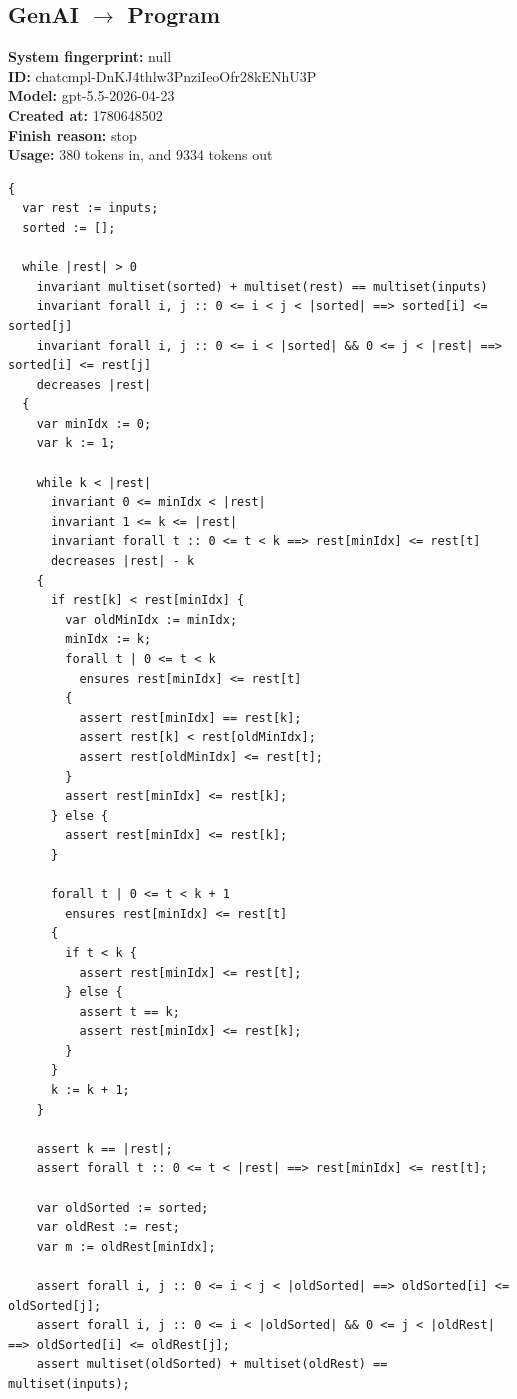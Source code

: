 \documentclass{article}
\begin{document}
\subsection*{GenAI $\rightarrow$ Program}
\textbf{System fingerprint: }null
\\\textbf{ID: }chatcmpl-DnKJ4thlw3PnziIeoOfr28kENhU3P
\\\textbf{Model: }gpt-5.5-2026-04-23
\\\textbf{Created at: }1780648502
\\\textbf{Finish reason: }stop
\\\textbf{Usage: }380 tokens in, and 9334 tokens out
\begin{lstlisting}
{
  var rest := inputs;
  sorted := [];

  while |rest| > 0
    invariant multiset(sorted) + multiset(rest) == multiset(inputs)
    invariant forall i, j :: 0 <= i < j < |sorted| ==> sorted[i] <= sorted[j]
    invariant forall i, j :: 0 <= i < |sorted| && 0 <= j < |rest| ==> sorted[i] <= rest[j]
    decreases |rest|
  {
    var minIdx := 0;
    var k := 1;

    while k < |rest|
      invariant 0 <= minIdx < |rest|
      invariant 1 <= k <= |rest|
      invariant forall t :: 0 <= t < k ==> rest[minIdx] <= rest[t]
      decreases |rest| - k
    {
      if rest[k] < rest[minIdx] {
        var oldMinIdx := minIdx;
        minIdx := k;
        forall t | 0 <= t < k
          ensures rest[minIdx] <= rest[t]
        {
          assert rest[minIdx] == rest[k];
          assert rest[k] < rest[oldMinIdx];
          assert rest[oldMinIdx] <= rest[t];
        }
        assert rest[minIdx] <= rest[k];
      } else {
        assert rest[minIdx] <= rest[k];
      }

      forall t | 0 <= t < k + 1
        ensures rest[minIdx] <= rest[t]
      {
        if t < k {
          assert rest[minIdx] <= rest[t];
        } else {
          assert t == k;
          assert rest[minIdx] <= rest[k];
        }
      }
      k := k + 1;
    }

    assert k == |rest|;
    assert forall t :: 0 <= t < |rest| ==> rest[minIdx] <= rest[t];

    var oldSorted := sorted;
    var oldRest := rest;
    var m := oldRest[minIdx];

    assert forall i, j :: 0 <= i < j < |oldSorted| ==> oldSorted[i] <= oldSorted[j];
    assert forall i, j :: 0 <= i < |oldSorted| && 0 <= j < |oldRest| ==> oldSorted[i] <= oldRest[j];
    assert multiset(oldSorted) + multiset(oldRest) == multiset(inputs);


\end{lstlisting}
\end{document}
